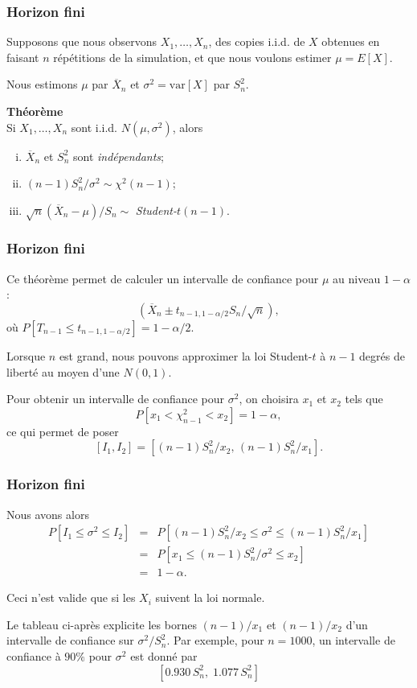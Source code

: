 \documentclass[t,usepdftitle=false]{beamer}
\def\var{\mbox{var}}
\def\iid{i.i.d.}
\begin{document}
\begin{frame}
\frametitle{Horizon fini}

Supposons que nous observons ${X_1,\dots,X_n}$, des copies \iid{} de
$X$ obtenues en faisant ${n}$ répétitions de la simulation, et que
nous voulons estimer ${\mu} = E[X]$.

\mbox{}

Nous estimons $\mu$ par $\overline{X}_n$ et $\sigma^2 = \var[X]$ par $S_n^2$.

\mbox{}

{\bf Théorème}\\
Si $X_1,\dots,X_n$ sont \iid{} $N(\mu,\sigma^2)$, alors
\begin{enumerate}[(i)]
\item
$\overline{X}_n$ et $S_n^2$ sont \emph{indépendants};
\item
$(n-1) S_n^2/\sigma^2 \sim \chi^2(n-1)$;
\item
$\sqrt{n}(\overline{X}_n - \mu)/S_n \sim$ \emph{Student-$t (n-1)$}.
\end{enumerate}

\end{frame}

\begin{frame}
\frametitle{Horizon fini}

Ce théorème permet de calculer un intervalle de confiance pour $\mu$ au niveau
$1-\alpha$:
\[
(\overline{X}_n \pm t_{n-1,1-\alpha/2} S_n/\sqrt{n}), 
\]
où $P[T_{n-1} \le t_{n-1,1-\alpha/2}] = 1 - \alpha/2$.

\mbox{}

Lorsque $n$ est grand, nous pouvons approximer la loi Student-$t$ à $n-1$ degrés de liberté au moyen d'une $N(0,1)$.


\mbox{}

Pour obtenir un intervalle de confiance pour $\sigma^2$, on choisira $x_1$ et $x_2$ tels que 
$$
  P[x_1 < \chi^2_{n-1} < x_2] = 1-\alpha,
$$
ce qui permet de poser
$$
  [{I_1}, {I_2}] = [(n-1)S_n^2/x_2,\, (n-1)S_n^2/x_1].
$$ 

\end{frame}

\begin{frame}
\frametitle{Horizon fini}

Nous avons alors
\begin{eqnarray*}
 P[I_1 \le \sigma^2 \le I_2] 
  &=& P[(n-1)S_n^2/x_2 \le \sigma^2 \le (n-1)S_n^2/x_1] \\
  &=& P[x_1 \le (n-1)S_n^2/\sigma^2 \le x_2] \\
  &=& 1-\alpha.
\end{eqnarray*}

\mbox{}

Ceci n'est valide que si les $X_i$ suivent la loi normale.

\mbox{}

Le tableau ci-après explicite les
bornes $(n-1)/x_1$ et $(n-1)/x_2$ d'un intervalle de confiance sur $\sigma^2/S_n^2$.
Par exemple, pour ${n=1000}$, un intervalle de confiance à $90\%$ pour $\sigma^2$ est donné par
\[
  [0.930\, S_n^2,\; 1.077\, S_n^2]
\]

\end{frame}
\end{document}

